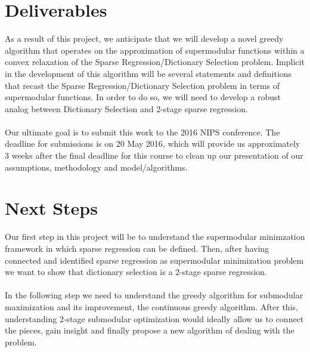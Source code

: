 \documentclass{article}
\begin{document}
\section{Deliverables} \label{methods}
As a result of this project, we anticipate that we will develop a novel greedy algorithm that operates on the approximation of supermodular functions within a convex relaxation of the Sparse Regression/Dictionary Selection problem. Implicit in the development of this algorithm will be several statements and definitions that recast the Sparse Regression/Dictionary Selection problem in terms of supermodular functions. In order to do so, we will need to develop a robust analog between Dictionary Selection and 2-stage sparse regression.
\\
\\
Our ultimate goal is to submit this work to the 2016 NIPS conference. The deadline for submissions is on 20 May 2016, which will provide us approximately 3 weeks after the final deadline for this course to clean up our presentation of our assumptions, methodology and model/algorithms.

\section{Next Steps} \label{next steps}
Our first step in this project will be to understand the supermodular minimzation framework in which sparse regression can be defined. Then, after having connected and identified sparse regression as supermodular minimization problem we want to show that dictionary selection is a 2-stage sparse regression. \\
\\
In the following step we need to understand the greedy algorithm for submodular maximization and its improvement, the continuous greedy algorithm. After this, understanding 2-stage submodular optimization would ideally allow us to connect the pieces, gain insight and finally propose a new algorithm of dealing with the problem.

%


\end{document}
